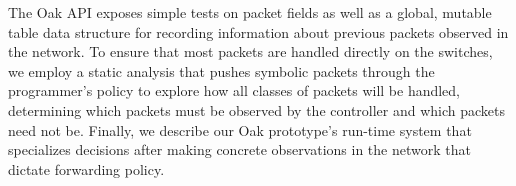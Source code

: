 \documentclass[preprint]{sigplanconf}
\begin{document}
The Oak API exposes simple tests on packet fields as well as a global, mutable table data
structure for recording information about previous packets observed in the network.
To ensure that most packets are handled directly on the switches, we employ a static analysis
that pushes symbolic packets through the programmer's policy to explore how all classes of 
packets will be handled, determining which packets must be observed by the controller and which 
packets need not be. Finally, we describe our Oak prototype's run-time system that 
specializes decisions after making concrete observations in the network that dictate forwarding policy.




\end{document}
